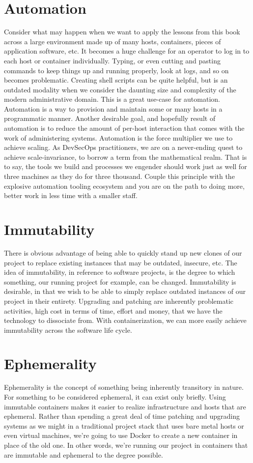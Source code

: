 \section{Automation}
\justify{}
Consider what may happen when we want to apply the lessons from this book
across a large environment made up of many hosts, containers, pieces of
application software, etc. It becomes a huge challenge for an operator
to log in to each host or container individually. Typing, or even cutting
and pasting commands to keep things up and running properly, look at logs,
and so on becomes problematic. Creating shell scripts can be quite helpful,
but is an outdated modality when we consider the daunting size and complexity
of the modern administrative domain.
\justify{}
This is a great use-case for automation. Automation is a way
to provision and maintain some or many hosts in a programmatic manner. Another
desirable goal, and hopefully result of automation is to reduce the amount of
per-host interaction that comes with the work of administering systems.
Automation is the force multiplier we use to achieve scaling.
As DevSecOps practitioners, we are on a never-ending quest to achieve
scale-invariance,
to borrow a term from the mathematical realm. That is to say, the tools we
build and processes we engender should work just as well for three machines
as they do for three thousand.
\justify{}
Couple this principle with the explosive automation tooling ecosystem and you
are on the path to doing more, better work in less time with a smaller staff.
\section{Immutability}
\justify{}
There is obvious advantage of being able to quickly stand up new clones
of our project to replace existing instances that may be outdated,
insecure, etc. The idea of immutability,
in reference to software projects, is the degree to which something, our
running project for example, can be changed. Immutability
is desirable, in that we wish to be able to simply replace outdated instances of our
project in their entirety. Upgrading and patching are inherently
problematic activities, high cost in terms of time, effort and money,
that we have the technology to dissociate from. With containerization,
we can more easily achieve immutability across the software life cycle.
\section{Ephemerality}
\justify{}
Ephemerality is the concept of something being inherently
transitory in nature. For something to be considered ephemeral, it can exist
only briefly. Using immutable containers makes it easier to realize
infrastructure and hosts that are ephemeral. Rather than spending a
great deal of time patching and upgrading systems as we might in a traditional
project stack that uses bare metal hosts or even virtual machines, we're going to
use Docker to create a new container in place of the old one. In other
words, we're running our project in containers that are immutable and
ephemeral to the degree possible.

